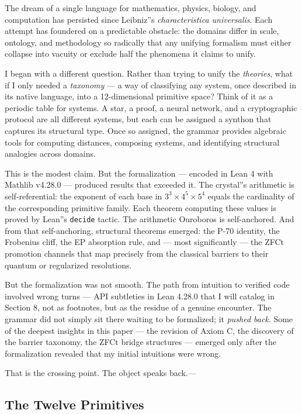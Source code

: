 \documentclass[12pt,a4paper]{article}
\begin{document}
The dream of a single language for mathematics, physics, biology, and computation has persisted since Leibniz''s \emph{characteristica universalis}. Each attempt has foundered on a predictable obstacle: the domains differ in scale, ontology, and methodology so radically that any unifying formalism must either collapse into vacuity or exclude half the phenomena it claims to unify.

I began with a different question. Rather than trying to unify the \emph{theories}, what if I only needed a \emph{taxonomy} --- a way of classifying any system, once described in its native language, into a 12-dimensional primitive space? Think of it as a periodic table for systems. A star, a proof, a neural network, and a cryptographic protocol are all different systems, but each can be assigned a synthon that captures its structural type. Once so assigned, the grammar provides algebraic tools for computing distances, composing systems, and identifying structural analogies across domains.

This is the modest claim. But the formalization --- encoded in Lean 4 with Mathlib v4.28.0 --- produced results that exceeded it. The crystal''s arithmetic is self-referential: the exponent of each base in $3^3 \times 4^5 \times 5^4$ equals the cardinality of the corresponding primitive family. Each theorem computing these values is proved by Lean''s \texttt{decide} tactic. The arithmetic Ouroboros is self-anchored. And from that self-anchoring, structural theorems emerged: the P-70 identity, the Frobenius cliff, the EP absorption rule, and --- most significantly --- the ZFCt promotion channels that map precisely from the classical barriers to their quantum or regularized resolutions.

But the formalization was not smooth. The path from intuition to verified code involved wrong turns --- API subtleties in Lean 4.28.0 that I will catalog in Section 8, not as footnotes, but as the residue of a genuine encounter. The grammar did not simply sit there waiting to be formalized; it \emph{pushed back}. Some of the deepest insights in this paper --- the revision of Axiom C, the discovery of the barrier taxonomy, the ZFCt bridge structures --- emerged only after the formalization revealed that my initial intuitions were wrong.

That is the crossing point. The object speaks back.---

\subsection{The Twelve Primitives}
\end{document}
